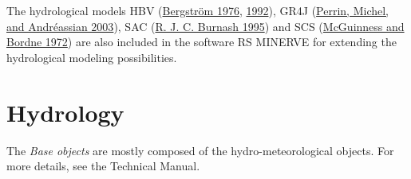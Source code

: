 \documentclass[
  letterpaper,
  DIV=11,
  numbers=noendperiod]{scrreprt}
\begin{document}
The hydrological models HBV
(\protect\hyperlink{ref-bergstrom_development_1976}{Bergström 1976},
\protect\hyperlink{ref-bergstrom_hbv_1992}{1992}), GR4J
(\protect\hyperlink{ref-perrin_improvement_2003}{Perrin, Michel, and
Andréassian 2003}), SAC (\protect\hyperlink{ref-burnash_nws_1995}{R. J.
C. Burnash 1995}) and SCS
(\protect\hyperlink{ref-mcguinness_comparison_1972}{McGuinness and
Bordne 1972}) are also included in the software RS MINERVE for extending
the hydrological modeling possibilities.

\hypertarget{sec-user_rainfall_runoff_hydrology}{%
\chapter{Hydrology}\label{sec-user_rainfall_runoff_hydrology}}

The \emph{Base objects} are mostly composed of the hydro-meteorological
objects. For more details, see the Technical Manual.
\end{document}
